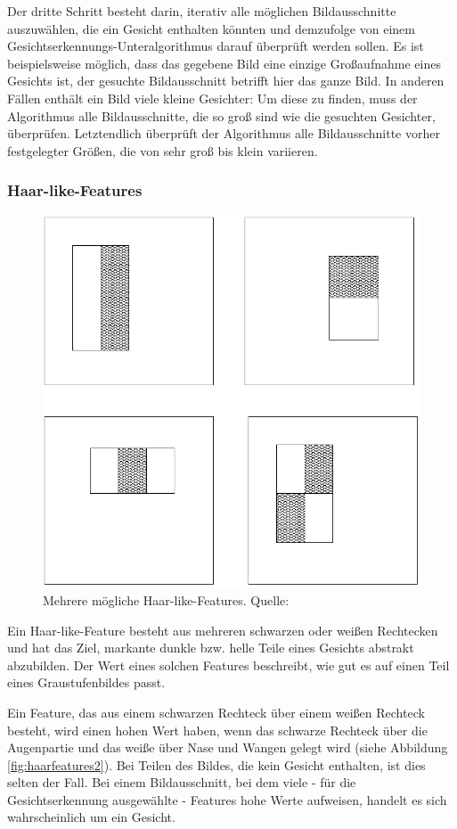 \documentclass[doktyp=semarbeit, sprache=german]{TUBAFarbeiten}
\begin{document}
Der dritte Schritt besteht darin, iterativ alle möglichen Bildausschnitte auszuwählen, die ein Gesicht enthalten könnten und demzufolge von einem Gesichtserkennungs-Unteralgorithmus darauf überprüft werden sollen. Es ist beispielsweise möglich, dass das gegebene Bild eine einzige Großaufnahme eines Gesichts ist, der gesuchte Bildausschnitt betrifft hier das ganze Bild. In anderen Fällen enthält ein Bild viele kleine Gesichter: Um diese zu finden, muss der Algorithmus alle Bildausschnitte, die so groß sind wie die gesuchten Gesichter, überprüfen. Letztendlich überprüft der Algorithmus alle Bildausschnitte vorher festgelegter Größen, die von sehr groß bis klein variieren.

\subsubsection{Haar-like-Features}
\begin{figure}
	\centering
	\includegraphics[width=0.4\linewidth]{images/haarfeatures}
	\caption[Haar-like-Features]{Mehrere mögliche Haar-like-Features. Quelle: \cite{Viola01rapidobject}}
	\label{fig:haarfeatures}
\end{figure}


Ein Haar-like-Feature besteht aus mehreren schwarzen oder weißen Rechtecken und hat das Ziel, markante dunkle bzw. helle Teile eines Gesichts abstrakt abzubilden. Der Wert eines solchen Features beschreibt, wie gut es auf einen Teil eines Graustufenbildes passt.

Ein Feature, das aus einem schwarzen Rechteck über einem weißen Rechteck besteht, wird einen hohen Wert haben, wenn das schwarze Rechteck über die Augenpartie und das weiße über Nase und Wangen gelegt wird (siehe Abbildung \ref{fig:haarfeatures2}). Bei Teilen des Bildes, die kein Gesicht enthalten, ist dies selten der Fall. Bei einem Bildausschnitt, bei dem viele - für die Gesichtserkennung ausgewählte - Features hohe Werte aufweisen, handelt es sich wahrscheinlich um ein Gesicht.
\end{document}
